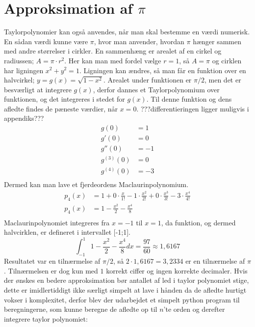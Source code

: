 \section{Approksimation af $\pi$}
Taylorpolynomier kan også anvendes, når man skal bestemme en værdi numerisk. En sådan værdi kunne være $\pi$, hvor man anvender, hvordan $\pi$ hænger sammen med andre størrelser i cirkler. En sammenhæng er arealet af en cirkel og radiussen; $A=\pi \cdot r^2$. Her kan man med fordel vælge $r=1$, så $A=\pi$ og cirklen har ligningen $x^2+y^2=1$. Ligningen kan ændres, så man får en funktion over en halvcirkel; $y=g(x)=\sqrt{1-x^2}$. Arealet under funktionen er $\pi/2$, men det er besværligt at integrere $g(x)$, derfor dannes et Taylorpolynomium over funktionen, og det integreres i stedet for $g(x)$. Til denne funktion og dens afledte findes de pæneste værdier, når $x=0$.
???differentieringen ligger muligvis i appendiks???
\begin{align*}
g(0) &= 1 \\
g'(0) &= 0 \\
g''(0) &= -1 \\
g^{(3)}(0) &= 0 \\
g^{(4)}(0) &= -3 \\
\end{align*}
Dermed kan man lave et fjerdeordens Maclaurinpolynomium.
\begin{align*}
p_{4} (x) &= 1 + 0\cdot \frac{x}{1!} - 1\cdot \frac{x^2}{2!} + 0\cdot \frac{x^3}{3!} - 3\cdot \frac{x^4}{4!}
\\
p_{4} (x) &= 1-\frac{x^2}{2}-\frac{x^4}{8} \\
\end{align*}
Maclaurinpolynomiet integreres fra $x=-1$ til $x=1$, da funktion, og dermed halvcirklen, er defineret i intervallet [-1;1].
\[
\int_{-1}^{1} 1-\frac{x^2}{2}-\frac{x^4}{8} dx = \frac{97}{60} \approx 1,6167
\]
Resultatet var en tilnærmelse af $\pi/2$, så $2\cdot 1,6167 = 3,2334$ er en tilnærmelse af $\pi$. Tilnærmelsen er dog kun med $1$ korrekt ciffer og ingen korrekte decimaler. 
Hvis der ønskes en bedere approksimation bør antallet af led i taylor polynomiet stige, dette er 
imidlertiddigt ikke særligt simpelt at lave i hånden da de afledte hurtigt vokser i komplexitet, %
derfor blev der udarbejdet et simpelt python program til beregningerne, 
som kunne beregne de afledte op til $n$'te orden og derefter integrere taylor polynomiet:
